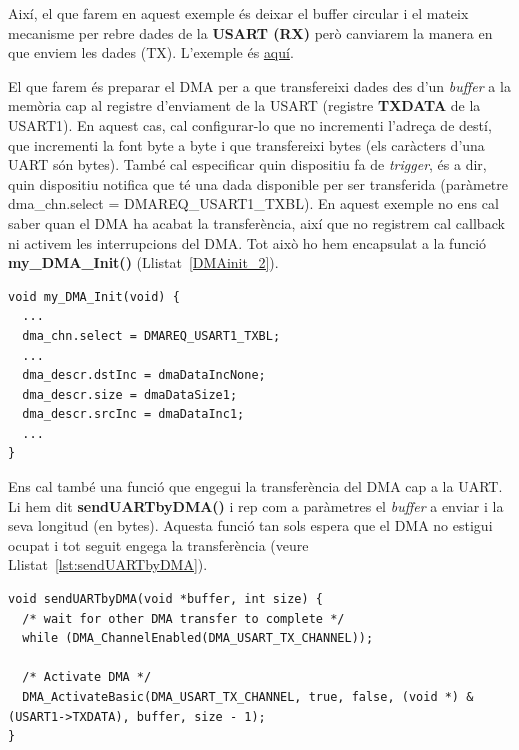 Així, el que farem en aquest exemple és deixar el \gls{buffer circular} i el mateix mecanisme per rebre dades de la {\bf USART (RX)} però canviarem la manera en que enviem les dades (TX). L'exemple és \href{https://github.com/mariusmm/cursembedded/tree/master/Simplicity/UART_DMA}{aquí}.

El que farem és preparar el DMA per a que transfereixi dades des d'un {\em buffer} a la memòria cap al registre d'enviament de la USART (registre {\bf TXDATA} de la USART1). En aquest cas, cal configurar-lo que no incrementi l'adreça de destí, que incrementi la font byte a byte i que transfereixi bytes (els caràcters d'una UART són bytes). També cal especificar quin dispositiu fa de {\em trigger}, és a dir, quin dispositiu notifica que té una dada disponible per ser transferida (paràmetre dma\_chn.select = DMAREQ\_USART1\_TXBL). En aquest exemple no ens cal saber quan el \gls{DMA} ha acabat la transferència, així que no registrem cal \gls{callback} ni activem les interrupcions del DMA. Tot això ho hem encapsulat a la funció {\bf my\_DMA\_Init()} (Llistat~\ref{DMAinit_2}).

\begin{lstlisting}[style=customc,caption={Diferències a la inicialització del DMA}, label=DMAinit_2]
void my_DMA_Init(void) {
  ...
  dma_chn.select = DMAREQ_USART1_TXBL;
  ...
  dma_descr.dstInc = dmaDataIncNone;
  dma_descr.size = dmaDataSize1;
  dma_descr.srcInc = dmaDataInc1;
  ...
}
\end{lstlisting}

Ens cal també una funció que engegui la transferència del DMA cap a la UART. Li hem dit {\bf sendUARTbyDMA()} i rep com a paràmetres el {\em buffer} a enviar i la seva longitud (en bytes). Aquesta funció tan sols espera que el DMA no estigui ocupat i tot seguit engega la transferència (veure Llistat~\ref{lst:sendUARTbyDMA}).

\begin{lstlisting}[style=customc, caption={Funció sendUARTbyDMA()}, label=lst:sendUARTbyDMA]
void sendUARTbyDMA(void *buffer, int size) {
  /* wait for other DMA transfer to complete */
  while (DMA_ChannelEnabled(DMA_USART_TX_CHANNEL));

  /* Activate DMA */
  DMA_ActivateBasic(DMA_USART_TX_CHANNEL, true, false, (void *) &(USART1->TXDATA), buffer, size - 1);
}
\end{lstlisting}

